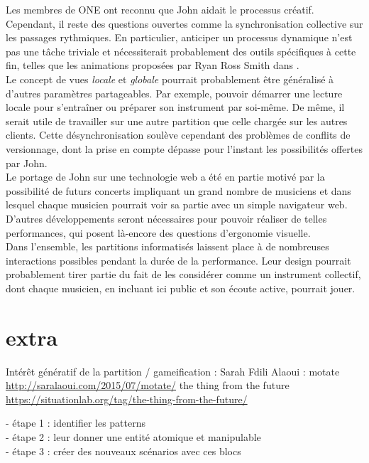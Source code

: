 \noindent Les membres de ONE ont reconnu que John aidait le processus créatif. Cependant, il reste des questions ouvertes comme la synchronisation collective sur les passages rythmiques. En particulier, anticiper un processus dynamique n'est pas une tâche triviale et nécessiterait probablement des outils spécifiques à cette fin, telles que les animations proposées par Ryan Ross Smith dans \cite{smith_atomic_2015}.\\
\indent Le concept de vues \textit{locale} et \textit{globale} pourrait probablement être généralisé à d'autres paramètres partageables. Par exemple, pouvoir démarrer une lecture locale pour s'entraîner ou préparer son instrument par soi-même. De même, il serait utile de travailler sur une autre partition que celle chargée sur les autres clients. Cette désynchronisation soulève cependant des problèmes de conflits de versionnage, dont la prise en compte dépasse pour l'instant les possibilités offertes par John.\\
\indent Le portage de John sur une technologie web a été en partie motivé par la possibilité de futurs concerts impliquant un grand nombre de musiciens et dans lesquel chaque musicien pourrait voir sa partie avec un simple navigateur web. D'autres développements seront nécessaires pour pouvoir réaliser de telles performances, qui posent là-encore des questions d'ergonomie visuelle.\\
\indent Dans l'ensemble, les partitions informatisés laissent place à de nombreuses interactions possibles pendant la durée de la performance. Leur design pourrait probablement tirer partie du fait de les considérer comme un instrument collectif, dont chaque musicien, en incluant ici public et son écoute active, pourrait jouer.


\section*{extra}
Intérêt génératif de la partition / gameification  :
Sarah Fdili Alaoui : motate \url{http://saralaoui.com/2015/07/motate/}
the thing from the future \url{https://situationlab.org/tag/the-thing-from-the-future/}

- étape 1 : identifier les patterns \\
- étape 2 : leur donner une entité atomique et manipulable\\
- étape 3 : créer des nouveaux scénarios avec ces blocs